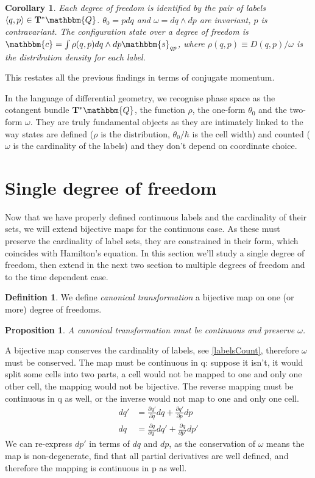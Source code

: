 \documentclass[aps,pra,10pt,twocolumn,floatfix,nofootinbib]{revtex4-1}
\newtheorem{cor}[thm]{Corollary}
\newtheorem{prop}[thm]{Proposition}
\theoremstyle{definition}
\newtheorem{defn}[thm]{Definition}
\begin{document}
\begin{cor}\label{continuousConjugateRelationships}
Each degree of freedom is identified by the pair of labels $\langle q,p \rangle \in \mathbf{T}^*\mathbbm{Q}$. $\theta_0 = p dq$ and $\omega = dq \wedge dp$ are invariant, $p$ is contravariant. The configuration state over a degree of freedom is $\mathbbm{c}=\int \rho(q,p) dq \wedge dp \mathbbm{s}_{qp}$, where $\rho(q,p)\equiv D(q,p) / \omega$ is the distribution density for each label.
\end{cor}

This restates all the previous findings in terms of conjugate momentum.

In the language of differential geometry, we recognise phase space as the cotangent bundle $\mathbf{T}^*\mathbbm{Q}$, the function $\rho$, the one-form $\theta_0$ and the two-form $\omega$. They are truly fundamental objects as they are intimately linked to the way states are defined ($\rho$ is the distribution, $\theta_0 / \hbar$ is the cell width) and counted ($\omega$ is the cardinality of the labels) and they don't depend on coordinate choice.

\section{Single degree of freedom}

Now that we have properly defined continuous labels and the cardinality of their sets, we will extend bijective maps for the continuous case. As these must preserve the cardinality of label sets, they are constrained in their form, which coincides with Hamilton's equation. In this section we'll study a single degree of freedom, then extend in the next two section to multiple degrees of freedom and to the time dependent case.

\begin{defn}\label{canonical}
We define \emph{canonical transformation} a bijective map on one (or more) degree of freedoms.
\end{defn}

\begin{prop}\label{continuousMapping}
A canonical transformation must be continuous and preserve $\omega$.
\end{prop}

A bijective map conserves the cardinality of labels, see \ref{labelsCount}, therefore $\omega$ must be conserved. The map must be continuous in q: suppose it isn't, it would split some cells into two parts, a cell would not be mapped to one and only one other cell, the mapping would not be bijective. The reverse mapping must be continuous in q as well, or the inverse would not map to one and only one cell.
\begin{align*}
dq' &= \frac{\partial q'}{\partial q} dq + \frac{\partial q'}{\partial p} dp \\
dq &= \frac{\partial q}{\partial q'} dq' + \frac{\partial q}{\partial p'} dp'
\end{align*}
We can re-express $dp'$ in terms of $dq$ and $dp$, as the conservation of $\omega$ means the map is non-degenerate, find that all partial derivatives are well defined, and therefore the mapping is continuous in p as well.
\end{document}
